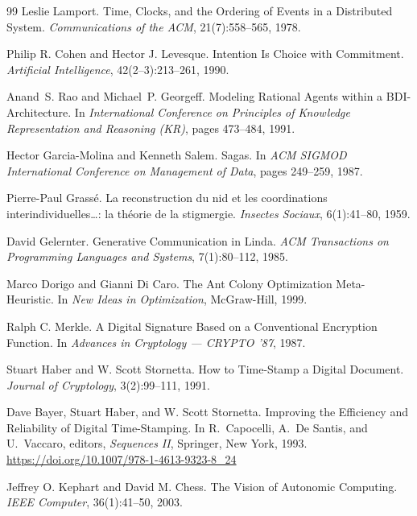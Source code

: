 \documentclass[11pt,a4paper]{article}
\theoremstyle{definition}
\theoremstyle{remark}
\begin{document}
\begin{thebibliography}{99}
Leslie Lamport.
\newblock Time, Clocks, and the Ordering of Events in a Distributed System.
\newblock \textit{Communications of the ACM}, 21(7):558--565, 1978.

Philip R. Cohen and Hector J. Levesque.
\newblock Intention Is Choice with Commitment.
\newblock \textit{Artificial Intelligence}, 42(2--3):213--261, 1990.

Anand~S. Rao and Michael~P. Georgeff.
\newblock Modeling Rational Agents within a BDI-Architecture.
\newblock In \textit{International Conference on Principles of Knowledge Representation and Reasoning (KR)}, pages 473--484, 1991.

Hector Garcia-Molina and Kenneth Salem.
\newblock Sagas.
\newblock In \textit{ACM SIGMOD International Conference on Management of Data}, pages 249--259, 1987.

Pierre-Paul Grass\'e.
\newblock La reconstruction du nid et les coordinations interindividuelles\ldots: la th\'eorie de la stigmergie.
\newblock \textit{Insectes Sociaux}, 6(1):41--80, 1959.

David Gelernter.
\newblock Generative Communication in Linda.
\newblock \textit{ACM Transactions on Programming Languages and Systems}, 7(1):80--112, 1985.

Marco Dorigo and Gianni Di Caro.
\newblock The Ant Colony Optimization Meta-Heuristic.
\newblock In \textit{New Ideas in Optimization}, McGraw-Hill, 1999.

Ralph C. Merkle.
\newblock A Digital Signature Based on a Conventional Encryption Function.
\newblock In \textit{Advances in Cryptology --- CRYPTO '87}, 1987.

Stuart Haber and W. Scott Stornetta.
\newblock How to Time-Stamp a Digital Document.
\newblock \textit{Journal of Cryptology}, 3(2):99--111, 1991.

Dave Bayer, Stuart Haber, and W. Scott Stornetta.
\newblock Improving the Efficiency and Reliability of Digital Time-Stamping.
\newblock In R.~Capocelli, A.~De Santis, and U.~Vaccaro, editors, \textit{Sequences II}, Springer, New York, 1993.
\newblock \url{https://doi.org/10.1007/978-1-4613-9323-8_24}

Jeffrey O. Kephart and David M. Chess.
\newblock The Vision of Autonomic Computing.
\newblock \textit{IEEE Computer}, 36(1):41--50, 2003.


\end{thebibliography}
\end{document}
